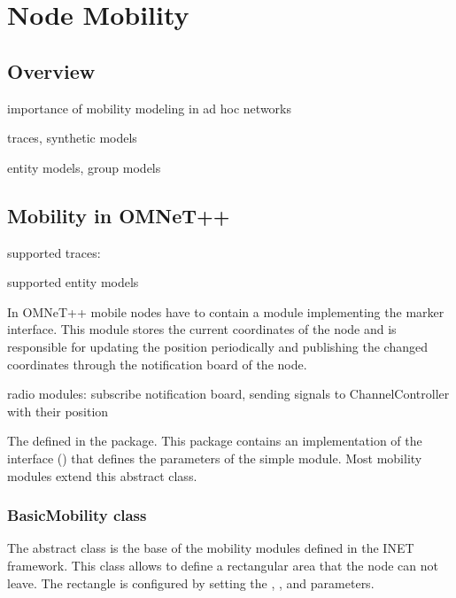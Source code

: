 \chapter{Node Mobility}
\label{cha:mobility}


\section{Overview}

importance of mobility modeling in ad hoc networks
\cite{Camp02asurvey}

traces, synthetic models

entity models, group models

\section{Mobility in OMNeT++}

supported traces:

supported entity models

In OMNeT++ mobile nodes have to contain a module implementing the
 marker interface. This module stores the current
coordinates of the node and is responsible for updating the position
periodically and publishing the changed coordinates through the
notification board of the node.

radio modules: subscribe notification board, sending signals to
ChannelController with their position

The  defined in the  package.
This package contains an implementation of the interface
() that defines the parameters of the
 simple module. Most mobility modules extend this
abstract class.


\subsection{BasicMobility class}

The abstract  class is the base of the mobility
modules defined in the INET framework. This class allows to define
a rectangular area that the node can not leave. The rectangle is configured
by setting the , ,
 and  parameters.

